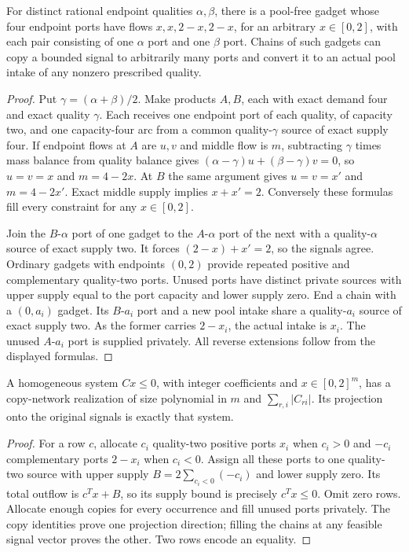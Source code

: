\begin{lemma}\label{s3:copy-lemma}
For distinct rational endpoint qualities $\alpha,\beta$, there is a
pool-free gadget whose four endpoint ports have flows
$x,x,2-x,2-x$, for an arbitrary $x\in[0,2]$, with each pair consisting
of one $\alpha$ port and one $\beta$ port. Chains of such gadgets can
copy a bounded signal to arbitrarily many ports and convert it to an
actual pool intake of any nonzero prescribed quality.
\end{lemma}
\begin{proof}
Put $\gamma=(\alpha+\beta)/2$. Make products $A,B$, each with exact
demand four and exact quality $\gamma$. Each receives one endpoint
port of each quality, of capacity two, and one capacity-four arc from a
common quality-$\gamma$ source of exact supply four. If endpoint flows
at $A$ are $u,v$ and middle flow is $m$, subtracting $\gamma$ times
mass balance from quality balance gives
$(\alpha-\gamma)u+(\beta-\gamma)v=0$, so $u=v=x$ and $m=4-2x$.
At $B$ the same argument gives $u=v=x'$ and $m=4-2x'$. Exact middle
supply implies $x+x'=2$. Conversely these formulas fill every constraint
for any $x\in[0,2]$.

Join the $B$-$\alpha$ port of one gadget to the $A$-$\alpha$ port of
the next with a quality-$\alpha$ source of exact supply two. It forces
$(2-x)+x'=2$, so the signals agree. Ordinary gadgets with endpoints
$(0,2)$ provide repeated positive and complementary quality-two ports.
Unused ports have distinct private sources with upper supply equal to
the port capacity and lower supply zero. End a chain with a $(0,a_i)$
gadget. Its $B$-$a_i$ port and a new pool intake share a quality-$a_i$
source of exact supply two. As the former carries $2-x_i$, the actual
intake is $x_i$. The unused $A$-$a_i$ port is supplied privately.
All reverse extensions follow from the displayed formulas.
\end{proof}

\begin{lemma}\label{s3:row-copy}
A homogeneous system $Cx\le0$, with integer coefficients and
$x\in[0,2]^m$, has a copy-network realization of size polynomial in
$m$ and $\sum_{r,i}|C_{ri}|$. Its projection onto the original signals
is exactly that system.
\end{lemma}
\begin{proof}
For a row $c$, allocate $c_i$ quality-two positive ports $x_i$ when
$c_i>0$ and $-c_i$ complementary ports $2-x_i$ when $c_i<0$.
Assign all these ports to one quality-two source with upper supply
$B=2\sum_{c_i<0}(-c_i)$ and lower supply zero. Its total outflow is
$c^Tx+B$, so its supply bound is precisely $c^Tx\le0$. Omit zero rows.
Allocate enough copies for every occurrence and fill unused ports
privately. The copy identities prove one projection direction; filling
the chains at any feasible signal vector proves the other. Two rows
encode an equality.
\end{proof}

